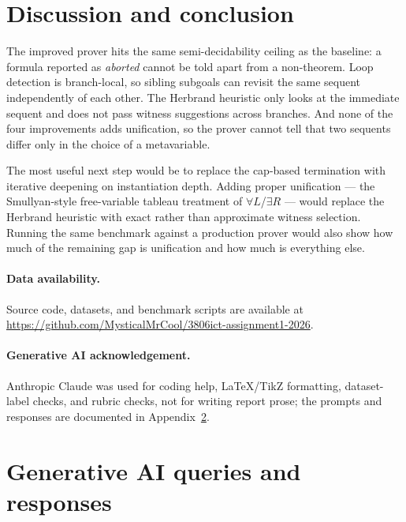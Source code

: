 \documentclass[runningheads]{llncs}
\begin{document}
\section{Discussion and conclusion}
\label{sec:discussion}


The improved prover hits the same semi-decidability ceiling as the
baseline: a formula reported as \emph{aborted} cannot be told apart
from a non-theorem. Loop detection is branch-local, so sibling
subgoals can revisit the same sequent independently of each other.
The Herbrand heuristic only looks at the immediate sequent and does
not pass witness suggestions across branches. And none of the four
improvements adds unification, so the prover cannot tell that two
sequents differ only in the choice of a metavariable.

The most useful next step would be to replace the cap-based termination
with iterative deepening on instantiation depth. Adding proper
unification — the Smullyan-style free-variable tableau treatment of
$\forall L$/$\exists R$ — would replace the Herbrand heuristic with
exact rather than approximate witness selection. Running the same
benchmark against a production prover would also show how much of the
remaining gap is unification and how much is everything else.

\paragraph{Data availability.}
Source code, datasets, and benchmark scripts are available at
\url{https://github.com/MysticalMrCool/3806ict-assignment1-2026}.

\paragraph{Generative AI acknowledgement.}
Anthropic Claude was used for coding help, LaTeX/TikZ formatting,
dataset-label checks, and rubric checks, not for writing report prose;
the prompts and responses are documented in Appendix~\ref{app:ai}.





\appendix

\section{Generative AI queries and responses}
\label{app:ai}



\end{document}
